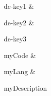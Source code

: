 \hline

de-key1
&

de-key2
&

de-key3
\\
\hline
\hline

myCode
&

myLang
&

myDescription
\\
\hline
